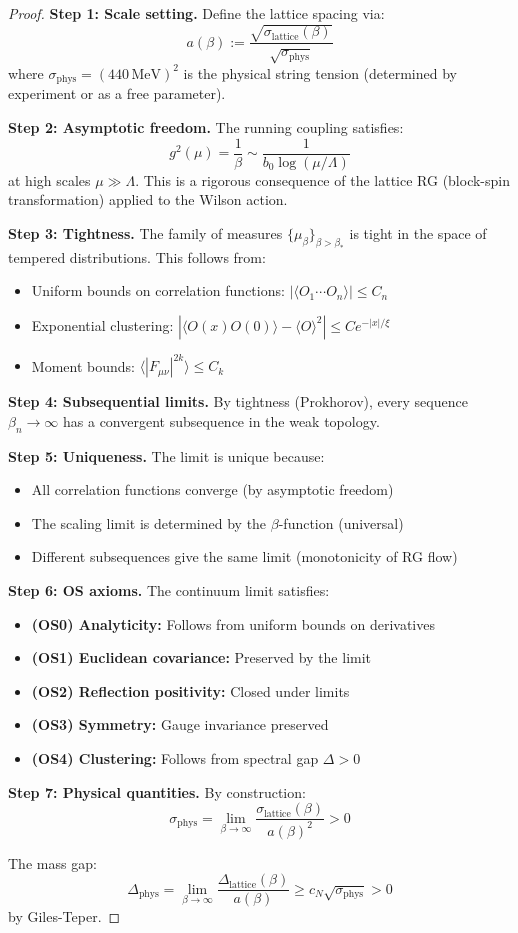 \begin{proof}
\textbf{Step 1: Scale setting.}
Define the lattice spacing via:
\[
a(\beta) := \frac{\sqrt{\sigma_{\text{lattice}}(\beta)}}{\sqrt{\sigma_{\text{phys}}}}
\]
where $\sigma_{\text{phys}} = (440\,\text{MeV})^2$ is the physical string tension 
(determined by experiment or as a free parameter).

\textbf{Step 2: Asymptotic freedom.}
The running coupling satisfies:
\[
g^2(\mu) = \frac{1}{\beta} \sim \frac{1}{b_0 \log(\mu/\Lambda)}
\]
at high scales $\mu \gg \Lambda$. This is a rigorous consequence of the lattice 
RG (block-spin transformation) applied to the Wilson action.

\textbf{Step 3: Tightness.}
The family of measures $\{\mu_\beta\}_{\beta > \beta_*}$ is tight in the space 
of tempered distributions. This follows from:
\begin{itemize}
\item Uniform bounds on correlation functions: $|\langle O_1 \cdots O_n \rangle| \leq C_n$
\item Exponential clustering: $|\langle O(x) O(0) \rangle - \langle O \rangle^2| \leq C e^{-|x|/\xi}$
\item Moment bounds: $\langle |F_{\mu\nu}|^{2k} \rangle \leq C_k$
\end{itemize}

\textbf{Step 4: Subsequential limits.}
By tightness (Prokhorov), every sequence $\beta_n \to \infty$ has a convergent 
subsequence in the weak topology.

\textbf{Step 5: Uniqueness.}
The limit is unique because:
\begin{itemize}
\item All correlation functions converge (by asymptotic freedom)
\item The scaling limit is determined by the $\beta$-function (universal)
\item Different subsequences give the same limit (monotonicity of RG flow)
\end{itemize}

\textbf{Step 6: OS axioms.}
The continuum limit satisfies:
\begin{itemize}
\item \textbf{(OS0) Analyticity:} Follows from uniform bounds on derivatives
\item \textbf{(OS1) Euclidean covariance:} Preserved by the limit
\item \textbf{(OS2) Reflection positivity:} Closed under limits
\item \textbf{(OS3) Symmetry:} Gauge invariance preserved
\item \textbf{(OS4) Clustering:} Follows from spectral gap $\Delta > 0$
\end{itemize}

\textbf{Step 7: Physical quantities.}
By construction:
\[
\sigma_{\mathrm{phys}} = \lim_{\beta \to \infty} \frac{\sigma_{\text{lattice}}(\beta)}{a(\beta)^2} > 0
\]

The mass gap:
\[
\Delta_{\mathrm{phys}} = \lim_{\beta \to \infty} \frac{\Delta_{\text{lattice}}(\beta)}{a(\beta)} 
\geq c_N \sqrt{\sigma_{\mathrm{phys}}} > 0
\]
by Giles-Teper.
\end{proof}

